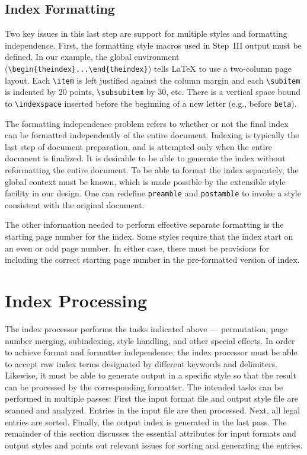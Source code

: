 \subsection{Index Formatting}
Two key issues in this last step are
support for multiple styles and formatting independence.
First, the formatting style macros used in Step~III output
must be defined.  In our example,
the global environment (\verb|\begin{theindex}...\end{theindex}|) tells
{\LaTeX} to use a two-column page layout.  Each \verb|\item| is
left justified against the column margin and each \verb|\subitem| is indented
by 20 points, \verb|\subsubitem| by 30, etc.
There is a vertical space bound to
\verb|\indexspace| inserted before the beginning of a new letter
(e.g., before \verb|beta|).

The formatting independence problem refers to whether or not the final index
can be formatted independently of the entire document.
Indexing is typically the last step of document preparation, and
is attempted only when the entire document is finalized.
It is desirable to be able to generate the index without
reformatting the entire document.  To be able to format
the index separately, the global context must be known, which is made possible
by the extensible style facility in our design.
One can redefine \verb|preamble| and \verb|postamble| to
invoke a style consistent with the original document.

The other information needed to perform effective separate formatting
is the starting page number for the index.
Some styles require that the index
start on an even or odd page number.
In either case, there must be provisions for including the correct
starting page number in the pre-formatted version of index.


\section{Index Processing}
The index processor performs the tasks indicated above ---
permutation, page number merging, subindexing, style handling, and other
special effects.  In order to achieve format and formatter independence,
the index processor must be able to accept raw index
terms designated by different keywords and delimiters.
Likewise, it must be able to generate output in a specific style
so that the result can be processed by the corresponding formatter.
The intended tasks can be performed in multiple passes:
First the input format file and output style file are scanned and analyzed.
Entries in the input file are then processed.  Next, all legal entries are
sorted.  Finally, the output index is generated in the last pass.
The remainder of this section discusses the essential attributes
for input formats and output styles and points out relevant issues
for sorting and generating the entries.


